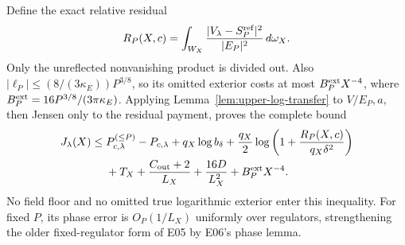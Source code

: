 Define the exact relative residual
\begin{equation}\label{eq:exact-relative-residual}
 R_P(X,c)=\int_{W_X}\frac{|V_\lambda-S_P^{\rm ref}|^2}{|E_P|^2}
                   \,d\omega_X.
\end{equation}
Only the unreflected nonvanishing product is divided out. Also
\(|\ell_P|\le(8/(3\kappa_E))P^{3/8}\), so its omitted exterior
costs at most
\(B_P^{\rm ext}X^{-4}\), where
\(B_P^{\rm ext}=16P^{3/8}/(3\pi\kappa_E)\).
Applying Lemma~\ref{lem:upper-log-transfer} to \(V/E_P,a\), then
Jensen only to the residual payment, proves the complete bound
\begin{align}\label{eq:euler-master}
 J_\lambda(X)\le{}&P_{c,\lambda}^{(\le P)}-P_{c,\lambda}
       +q_X\log b_\delta
       +\frac{q_X}{2}\log\left(1+\frac{R_P(X,c)}{q_X\delta^2}\right)
       \nonumber\\
 &+T_X+\frac{C_{\rm out}+2}{L_X}
       +\frac{16D}{L_X^2}+B_P^{\rm ext}X^{-4}.
\end{align}
No field floor and no omitted true logarithmic exterior enter this
inequality. For fixed \(P\), its phase error is \(O_P(1/L_X)\)
uniformly over regulators, strengthening the older fixed-regulator
form of E05 by E06's phase lemma.

